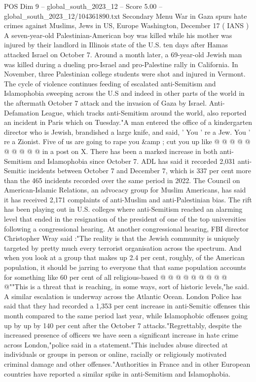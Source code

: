 \begin{textsample}{POS Dim 9 – global\_south\_2023\_12 – Score 5.00 – global\_south\_2023\_12/104361890.txt}  \label{ex:f9_pos_013}
Secondary Menu War in Gaza spurs hate crimes against Muslims, Jews in US, Europe Washington, December 17 ( IANS ) A seven-year-old Palestinian-American boy was killed while his mother was injured by their landlord in Illinois state of the U.S. ten days after Hamas attacked Israel on October 7.
Around a month later, a 69-year-old Jewish man was killed during a dueling pro-Israel and pro-Palestine rally in California.
In November, three Palestinian college students were shot and injured in Vermont.
The cycle of violence continues feeding of escalated anti-Semitism and Islamophobia sweeping across the U.S and indeed in other parts of the world in the aftermath October 7 attack and the invasion of Gaza by Israel.
Anti-Defamation League, which tracks anti-Semitism around the world, also reported an incident in Paris which on Tuesday."A man entered the office of a kindergarten director who is Jewish, brandished a large knife, and said, ' You ' re a Jew.
You ' re a Zionist.
Five of us are going to rape you \&amp ; cut you up like @ @ @ @ @ @ @ @ @ @ in a post on X.
There has been a marked increase in both anti-Semitism and Islamophobia since October 7.
ADL has said it recorded 2,031 anti-Semitic incidents between October 7 and December 7, which is 337 per cent more than the 465 incidents recorded over the same period in 2022.
The Council on American-Islamic Relations, an advocacy group for Muslim Americans, has said it has received 2,171 complaints of anti-Muslim and anti-Palestinian bias.
The rift has been playing out in U.S. colleges where anti-Semitism reached an alarming level that ended in the resignation of the president of one of the top universities following a congressional hearing.
At another congressional hearing, FBI director Christopher Wray said :"The reality is that the Jewish community is uniquely targeted by pretty much every terrorist organisation across the spectrum.
And when you look at a group that makes up 2.4 per cent, roughly, of the American population, it should be jarring to everyone that that same population accounts for something like 60 per cent of all religious-based @ @ @ @ @ @ @ @ @ @""This is a threat that is reaching, in some ways, sort of historic levels,"he said.
A similar escalation is underway across the Atlantic Ocean.
London Police has said that they had recorded a 1,353 per cent increase in anti-Semitic offenses this month compared to the same period last year, while Islamophobic offenses going up by up by 140 per cent after the October 7 attacks."Regrettably, despite the increased presence of officers we have seen a significant increase in hate crime across London,"police said in a statement."This includes abuse directed at individuals or groups in person or online, racially or religiously motivated criminal damage and other offenses."Authorities in France and in other European countries have reported a similar spike in anti-Semitism and Islamophobia.

\end{textsample}
